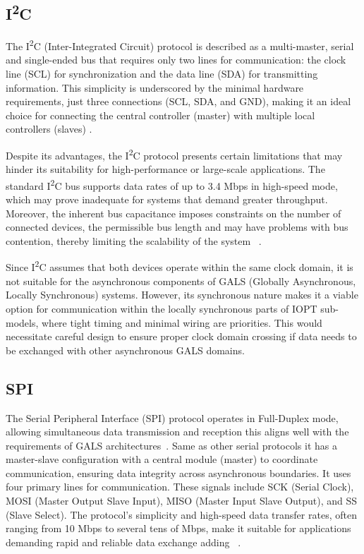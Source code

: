 \subsection{I\textsuperscript{2}C}
\label{subsub:i2c}

The I\textsuperscript{2}C  (Inter-Integrated Circuit) protocol is described as a multi-master, serial and single-ended bus that requires only two lines for communication: the clock line (SCL) for synchronization and the data line (SDA) for transmitting information. This simplicity is underscored by the minimal hardware requirements, just three connections (SCL, SDA, and GND), making it an ideal choice for connecting the central controller (master) with multiple local controllers (slaves) \cite{i2c}.

Despite its advantages, the I\textsuperscript{2}C  protocol presents certain limitations that may hinder its suitability for high-performance or large-scale applications. The standard I\textsuperscript{2}C bus supports data rates of up to 3.4 Mbps in high-speed mode, which may prove inadequate for systems that demand greater throughput. Moreover, the inherent bus capacitance imposes constraints on the number of connected devices, the permissible bus length and may have problems with bus contention, thereby limiting the scalability of the system ~\cite{I2Cv2}.

Since I\textsuperscript{2}C assumes that both devices operate within the same clock domain, it is not suitable for the asynchronous components of GALS (Globally Asynchronous, Locally Synchronous) systems. However, its synchronous nature makes it a viable option for communication within the locally synchronous parts of IOPT sub-models, where tight timing and minimal wiring are priorities. This would necessitate careful design to ensure proper clock domain crossing if data needs to be exchanged with other asynchronous GALS domains.

\subsection{SPI}
\label{subsub:spi}

The Serial Peripheral Interface (SPI) protocol operates in Full-Duplex mode, allowing simultaneous data transmission and reception this aligns well with the requirements of GALS architectures~\cite{spisite}. Same as other serial protocols it has a master-slave configuration with a central module (master) to coordinate communication, ensuring data integrity across asynchronous boundaries. It uses four primary lines for communication. These signals include SCK (Serial Clock), MOSI (Master Output Slave Input), MISO (Master Input Slave Output), and SS (Slave Select). The protocol's simplicity and high-speed data transfer rates, often ranging from 10 Mbps to several tens of Mbps, make it suitable for applications demanding rapid and reliable data exchange adding ~\cite{spisite}.

